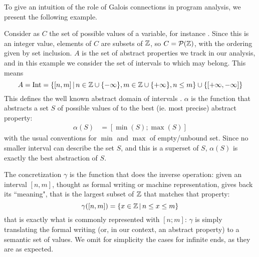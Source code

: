 To give an intuition of the role of Galois connections in program analysis, we present the following example.
\begin{example}[Intervals]\label{ex:bg:intervals}
	Consider as $C$ the set of possible values of a variable, for instance . Since this is an integer value, elements of $C$ are subsets of $\mathbb{Z}$, so $C = \mathcal{P}(\mathbb{Z})$, with the ordering given by set inclusion. $A$ is the set of abstract properties we track in our analysis, and in this example we consider the set of intervals to which  may belong. This means
	\[
	A = \text{Int} = \{ [n, m] \,\vert\, n \in \mathbb{Z} \cup \{ -\infty \}, m \in \mathbb{Z} \cup \{ +\infty \}, n \le m \} \cup \{ [+\infty, -\infty] \}
	\]
	This defines the well known abstract domain of intervals \cite{CC77}.
	$\alpha$ is the function that abstracts a set $S$ of possible values of  to the best (ie. most precise) abstract property:
	\begin{align*}
		\alpha(S) &= [\min(S); \max(S)]
	\end{align*}
	with the usual conventions for $\min$ and $\max$ of empty/unbound set.
	Since no smaller interval can describe the set $S$, and this is a superset of $S$, $\alpha(S)$ is exactly the best abstraction of $S$.
	
	The concretization $\gamma$ is the function that does the inverse operation: given an interval $[n, m]$, thought as formal writing or machine representation, gives back its ``meaning", that is the largest subset of $\mathbb{Z}$ that matches that property:
	\[
	\gamma([n, m]) = \{ x \in \mathbb{Z} \,\vert\, n \le x \le m \}
	\]
	that is exactly what is commonly represented with $[n; m]$: $\gamma$ is simply translating the formal writing (or, in our context, an abstract property) to a semantic set of values.
	We omit for simplicity the cases for infinite ends, as they are as expected.


\end{example}
